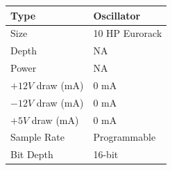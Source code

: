 \documentclass[12pt,letter]{article}
\begin{document}
\begin{table}[!htp]
\begin{tabular}{|l|l|}
\hline
Type             & Oscillator               \\
\hline
Size             & 10 HP Eurorack           \\
\hline
Depth            & NA                       \\
\hline
Power            & NA                       \\ %
\hline
$+12V$ draw (mA) & 0 mA                     \\
\hline
$-12V$ draw (mA) & 0 mA                     \\
\hline
$+5V$ draw (mA)  & 0 mA                     \\
\hline
Sample Rate      & Programmable             \\
\hline
Bit Depth        & 16-bit                   \\
\hline
\end{tabular}
\end{table}


\clearpage
\renewcommand\refname{References \& Acknowledgments}
\nocite{*}


\end{document}
